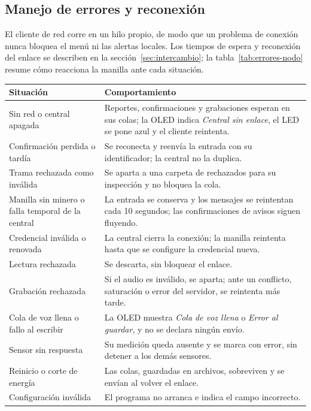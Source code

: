 \documentclass[10pt,a4paper]{article}
\begin{document}
\subsection{Manejo de errores y reconexión}
\label{sec:errores-nodo}
El cliente de red corre en un hilo propio, de modo que un problema de conexión nunca bloquea el menú ni las alertas locales. Los tiempos de espera y reconexión del enlace se describen en la sección~\ref{sec:intercambio}; la tabla~\ref{tab:errores-nodo} resume cómo reacciona la manilla ante cada situación.

\label{tab:errores-nodo}
\begin{tabularx}{\linewidth}{@{}P{52mm}Y@{}}
\toprule\textbf{Situación} & \textbf{Comportamiento}\\\midrule
Sin red o central apagada & Reportes, confirmaciones y grabaciones esperan en sus colas; la OLED indica \emph{Central sin enlace}, el LED se pone azul y el cliente reintenta.\\
Confirmación perdida o tardía & Se reconecta y reenvía la entrada con su identificador; la central no la duplica.\\
Trama rechazada como inválida & Se aparta a una carpeta de rechazados para su inspección y no bloquea la cola.\\
Manilla sin minero o falla temporal de la central & La entrada se conserva y los mensajes se reintentan cada 10 segundos; las confirmaciones de avisos siguen fluyendo.\\
Credencial inválida o renovada & La central cierra la conexión; la manilla reintenta hasta que se configure la credencial nueva.\\
Lectura rechazada & Se descarta, sin bloquear el enlace.\\
Grabación rechazada & Si el audio es inválido, se aparta; ante un conflicto, saturación o error del servidor, se reintenta más tarde.\\
Cola de voz llena o fallo al escribir & La OLED muestra \emph{Cola de voz llena} o \emph{Error al guardar}, y no se declara ningún envío.\\
Sensor sin respuesta & Su medición queda ausente y se marca con error, sin detener a los demás sensores.\\
Reinicio o corte de energía & Las colas, guardadas en archivos, sobreviven y se envían al volver el enlace.\\
Configuración inválida & El programa no arranca e indica el campo incorrecto.\\\bottomrule
\end{tabularx}
\end{document}

